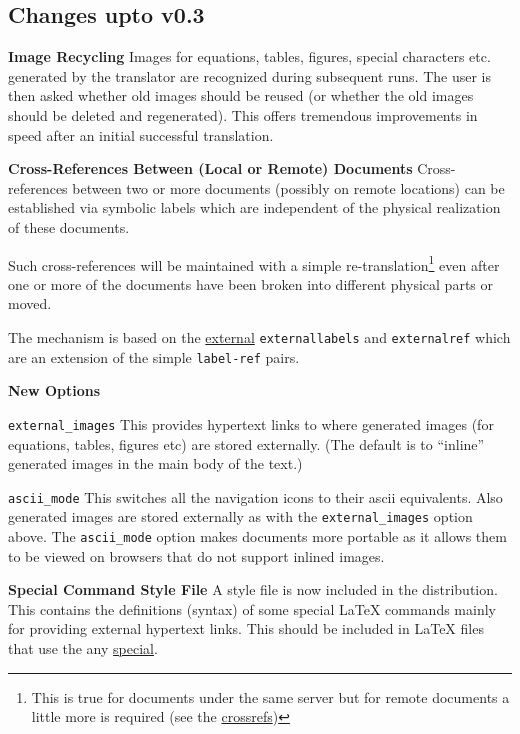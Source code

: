 \subsection{Changes upto v0.3}
\begin{htmllist}
\item [\textbf{Image Recycling}]
Images for equations, tables, figures, special characters etc. generated by
the translator are recognized  during subsequent runs.
The user is then asked whether old images should be reused
(or whether the old images should be deleted and regenerated).
This offers tremendous improvements in speed after an initial
successful translation.

\item [\textbf{Cross-References Between (Local or Remote) Documents}]
Cross-references between 
two or more documents (possibly on remote locations) can be
established via symbolic labels
which are independent of the physical realization of these documents. 

Such cross-references will be maintained with a simple
re-translation\footnote{This is true for documents under the same
server but for remote documents a little more is required (see 
the \hyperref{example}{example in Section}{}{crossrefs})}
even after one or more of the documents have been broken into
different physical parts or moved.

The mechanism is based on the 
\hyperref{new commands}{new commands (see Section }{ )}{external}
\texttt{externallabels} and \texttt{externalref} which are an extension of the simple 
\texttt{label-ref} pairs. 

\item [\textbf{New Options}] \hfill
\begin{htmllist}
\item [\texttt{external\_images}] This provides hypertext links to where
generated images (for equations, tables, figures etc) are stored
externally. (The default is to ``inline'' generated images in the main body 
of the text.)
\item [\texttt{ascii\_mode}] This switches all the navigation icons to their
ascii equivalents. Also generated images are stored externally as with the 
\texttt{external\_images} option above. The \texttt{ascii\_mode} option
makes documents more portable as it allows them to be
viewed on browsers that do not support inlined images.
\end{htmllist}
\item [\textbf{Special Command Style File}] A style file 
is now included in the
distribution. This contains the definitions (syntax) of some 
special LaTeX commands mainly for providing external hypertext
links.
This should be included in LaTeX files that use the any 
\hyperref{hypermedia extensions}{hypermedia extensions (see Section}{ )}{special}.


\end{htmllist}
